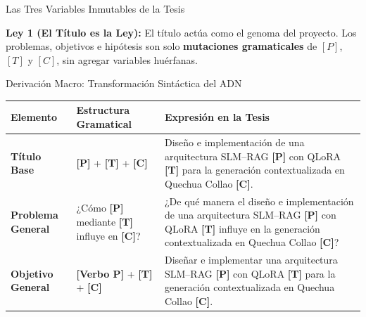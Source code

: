 \documentclass[aspectratio=169, 10pt, spanish]{beamer}
\begin{document}
\begin{frame}{Las Tres Variables Inmutables de la Tesis}
    \vspace{0.2cm}
    \begin{tcolorbox}[enhanced, colback=bpLightGray, colframe=bpNavy, width=13.0cm, center, arc=1.2mm, top=1.2mm, bottom=1.2mm]
        \centering\tiny\sffamily
        \textbf{\color{bpNavy}Ley 1 (El Título es la Ley):} El título actúa como el genoma del proyecto. Los problemas, objetivos e hipótesis son solo \textbf{mutaciones gramaticales} de $[P]$, $[T]$ y $[C]$, sin agregar variables huérfanas.
    \end{tcolorbox}
\end{frame}

\begin{frame}{Derivación Macro: Transformación Sintáctica del ADN}
    \vspace{-0.3cm}
    \begin{center}
    \tiny
    \begin{tabularx}{\textwidth}{l p{3.2cm} X}
        \toprule
        \textbf{\color{bpNavy}Elemento} & \textbf{\color{bpNavy}Estructura Gramatical} & \textbf{\color{bpNavy}Expresión en la Tesis} \\
        \midrule
        \textbf{Título Base} & 
        \textbf{\color{bpBlue}[P]} + \textbf{\color{bpGold!90!black}[T]} + \textbf{\color{bpRust}[C]} & 
        Diseño e implementación de una arquitectura SLM--RAG \textbf{\color{bpBlue}[P]} con QLoRA \textbf{\color{bpGold!90!black}[T]} para la generación contextualizada en Quechua Collao \textbf{\color{bpRust}[C]}. \\
        \addlinespace[0.15cm]
        \textbf{Problema General} & 
        ¿Cómo \textbf{\color{bpBlue}[P]} mediante \textbf{\color{bpGold!90!black}[T]} influye en \textbf{\color{bpRust}[C]}? & 
        ¿De qué manera el diseño e implementación de una arquitectura SLM--RAG \textbf{\color{bpBlue}[P]} con QLoRA \textbf{\color{bpGold!90!black}[T]} influye en la generación contextualizada en Quechua Collao \textbf{\color{bpRust}[C]}? \\
        \addlinespace[0.15cm]
        \textbf{Objetivo General} & 
        \textbf{\color{bpBlue}[Verbo P]} + \textbf{\color{bpGold!90!black}[T]} + \textbf{\color{bpRust}[C]} & 
        Diseñar e implementar una arquitectura SLM--RAG \textbf{\color{bpBlue}[P]} con QLoRA \textbf{\color{bpGold!90!black}[T]} para la generación contextualizada en Quechua Collao \textbf{\color{bpRust}[C]}. \\

\end{tabularx}
\end{center}
\end{frame}
\end{document}
